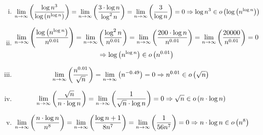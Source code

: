 \documentclass[a4paper]{scrartcl}
\begin{document}
\begin{enumerate}
\begin{enumerate}[i.]
            \item
                \begin{equation*}
                    \lim_{n \to \infty} \left( \frac{\log n^3}{\log \left( n^{\log n} \right)} \right)
                    = \lim_{n \to \infty} \left( \frac{3 \cdot \log n}{\log^2 n} \right)
                    = \lim_{n \to \infty} \left( \frac{3}{\log n} \right)
                    = 0 \Rightarrow \log n^3 \in o \left( \log \left( n^{\log n} \right) \right)
                \end{equation*}

            \item
                \begin{equation*}
                    \begin{gathered}
                        \lim_{n \to \infty} \left( \frac{\log \left( n^{\log n} \right)}{n^{\num{0,01}}} \right)
                        = \lim_{n \to \infty} \left( \frac{\log^2 n}{n^{\num{0,01}}} \right)
                        = \lim_{n \to \infty} \left( \frac{200 \cdot \log n}{n^{\num{0,01}}} \right)
                        = \lim_{n \to \infty} \left( \frac{20000}{n^{\num{0,01}}} \right)
                        = 0 \\
                        \Rightarrow \log \left( n^{\log n} \right) \in o \left( n^{\num{0,01}} \right)
                    \end{gathered}
                \end{equation*}

            \item
                \begin{equation*}
                    \lim_{n \to \infty} \left( \frac{n^{\num{0,01}}}{\sqrt{n}} \right)
                    = \lim_{n \to \infty} \left( n^{\num{-0,49}} \right)
                    = 0
                    \Rightarrow n^{\num{0,01}} \in o \left( \sqrt{n} \right)
                \end{equation*}

            \item
                \begin{equation*}
                    \lim_{n \to \infty} \left( \frac{\sqrt{n}}{n \cdot \log n} \right)
                    = \lim_{n \to \infty} \left( \frac{1}{\sqrt{n} \cdot \log n} \right)
                    = 0
                    \Rightarrow \sqrt{n} \in o \left( n \cdot \log n \right)
                \end{equation*}

            \item
                \begin{equation*}
                    \lim_{n \to \infty} \left( \frac{n \cdot \log n}{n^8} \right)
                    = \lim_{n \to \infty} \left( \frac{\log n + 1}{8n^7} \right)
                    = \lim_{n \to \infty} \left( \frac{1}{56n^7} \right)
                    = 0
                    \Rightarrow n \cdot \log n \in o \left( n^8 \right)
                \end{equation*}


\end{enumerate}
\end{enumerate}
\end{document}
